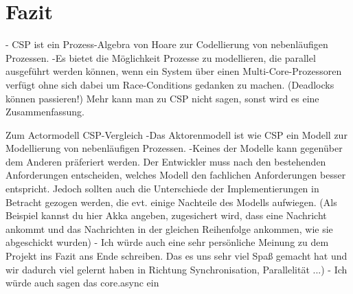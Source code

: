 \chapter{Fazit}

- CSP ist ein Prozess-Algebra von Hoare zur Codellierung von  nebenläufigen Prozessen.
-Es bietet die Möglichkeit Prozesse zu modellieren, die parallel ausgeführt werden können, wenn ein System über einen  Multi-Core-Prozessoren verfügt ohne sich dabei um  Race-Conditions gedanken zu machen. (Deadlocks können passieren!)
	Mehr kann man zu CSP nicht sagen, sonst wird es eine Zusammenfassung.
	
Zum Actormodell CSP-Vergleich
-Das Aktorenmodell ist wie CSP ein Modell zur Modellierung von nebenläufigen Prozessen.
-Keines der Modelle kann gegenüber dem Anderen präferiert werden. Der Entwickler muss nach den bestehenden Anforderungen entscheiden, welches Modell den fachlichen Anforderungen besser entspricht. Jedoch sollten auch die Unterschiede der Implementierungen in Betracht gezogen werden, die evt. einige Nachteile des Modells aufwiegen.
(Als Beispiel kannst du hier Akka angeben, zugesichert wird, dass eine Nachricht ankommt und das Nachrichten in der gleichen Reihenfolge ankommen, wie sie abgeschickt wurden)
- Ich würde auch eine sehr persönliche Meinung zu dem Projekt ins Fazit ans Ende schreiben. Das es uns sehr viel Spaß gemacht hat und wir dadurch viel gelernt haben in Richtung Synchronisation, Parallelität ...)
- Ich würde auch sagen das core.async ein 


